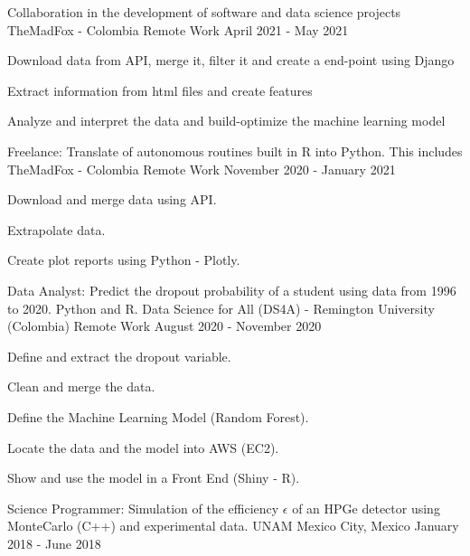 \begin{cventries}
  \cventry
    {Collaboration in the development of software and data science projects } %
    {TheMadFox - Colombia} %
    {Remote Work} %
    {April 2021 - May 2021} %
    {
      \begin{cvitems} %
\item {Download data from API, merge it, filter it and create a end-point using Django}
\item {Extract information from html files and create features}
\item {Analyze and interpret the data and build-optimize the machine learning model}
      \end{cvitems}
    }
    
  \cventry
    {Freelance: Translate of autonomous routines built in R into Python. This includes} %
    {TheMadFox - Colombia} %
    {Remote Work} %
    {November 2020 - January 2021} %
    {
      \begin{cvitems} %
\item {Download and merge data using API.}
\item {Extrapolate data.}
\item {Create plot reports using Python - Plotly. }
      \end{cvitems}
    }
  \cventry
  	{Data Analyst: Predict the dropout probability of a student using data from 1996 to 2020. Python and R. }%
    {Data Science for All (DS4A) - Remington University (Colombia)} %
    {Remote Work} %
    {August 2020 - November 2020} %
    {
      \begin{cvitems} %
\item {Define and extract the dropout variable.}
\item {Clean and merge the data.}
\item {Define the Machine Learning Model (Random Forest).}
\item {Locate the data and the model into AWS (EC2).}
\item {Show and use the model in a Front End (Shiny - R).}
      \end{cvitems}
    }
  \cventry
  	{Science Programmer: Simulation of the efficiency $\epsilon$ of an HPGe detector using MonteCarlo (C++) and experimental data.}%
    {UNAM} %
    {Mexico City, Mexico} %
    {January 2018 - June 2018} %
    {}
\end{cventries}
